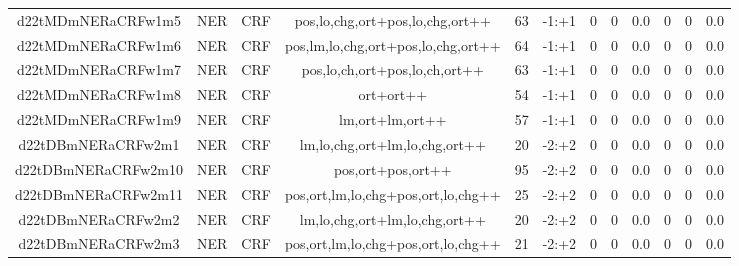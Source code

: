 \documentclass[a4paper]{article}
\begin{document}
\begin{landscape}
\begin{center}
\begin{tabular}{ |c|c|c|c|c|c|c|c|c|c|c|c|}
 
 	
 	\small{ d22tMDmNERaCRFw1m5 } & \small{ NER} & \small{  CRF }  & pos,lo,chg,ort+pos,lo,chg,ort++  &  63 &  \small{  -1:+1 }  &  0 & 0 & 0.0  &  0 & 0 & 0.0 \\
 	

 
 	
 	\small{ d22tMDmNERaCRFw1m6 } & \small{ NER} & \small{  CRF }  & pos,lm,lo,chg,ort+pos,lo,chg,ort++  &  64 &  \small{  -1:+1 }  &  0 & 0 & 0.0  &  0 & 0 & 0.0 \\
 	

 
 	
 	\small{ d22tMDmNERaCRFw1m7 } & \small{ NER} & \small{  CRF }  & pos,lo,ch,ort+pos,lo,ch,ort++  &  63 &  \small{  -1:+1 }  &  0 & 0 & 0.0  &  0 & 0 & 0.0 \\
 	

 
 	
 	\small{ d22tMDmNERaCRFw1m8 } & \small{ NER} & \small{  CRF }  & ort+ort++  &  54 &  \small{  -1:+1 }  &  0 & 0 & 0.0  &  0 & 0 & 0.0 \\
 	

 
 	
 	\small{ d22tMDmNERaCRFw1m9 } & \small{ NER} & \small{  CRF }  & lm,ort+lm,ort++  &  57 &  \small{  -1:+1 }  &  0 & 0 & 0.0  &  0 & 0 & 0.0 \\
 	

 
 	
 	\small{ d22tDBmNERaCRFw2m1 } & \small{ NER} & \small{  CRF }  & lm,lo,chg,ort+lm,lo,chg,ort++  &  20 &  \small{  -2:+2 }  &  0 & 0 & 0.0  &  0 & 0 & 0.0 \\
 	

 
 	
 	\small{ d22tDBmNERaCRFw2m10 } & \small{ NER} & \small{  CRF }  & pos,ort+pos,ort++  &  95 &  \small{  -2:+2 }  &  0 & 0 & 0.0  &  0 & 0 & 0.0 \\
 	

 
 	
 	\small{ d22tDBmNERaCRFw2m11 } & \small{ NER} & \small{  CRF }  & pos,ort,lm,lo,chg+pos,ort,lo,chg++  &  25 &  \small{  -2:+2 }  &  0 & 0 & 0.0  &  0 & 0 & 0.0 \\
 	

 
 	
 	\small{ d22tDBmNERaCRFw2m2 } & \small{ NER} & \small{  CRF }  & lm,lo,chg,ort+lm,lo,chg,ort++  &  20 &  \small{  -2:+2 }  &  0 & 0 & 0.0  &  0 & 0 & 0.0 \\
 	

 
 	
 	\small{ d22tDBmNERaCRFw2m3 } & \small{ NER} & \small{  CRF }  & pos,ort,lm,lo,chg+pos,ort,lo,chg++  &  21 &  \small{  -2:+2 }  &  0 & 0 & 0.0  &  0 & 0 & 0.0 \\
 	


\end{tabular}
\end{center}
\end{landscape}
\end{document}

